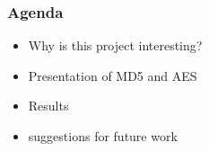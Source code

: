 \begin{frame}
  \frametitle{Agenda}
  \begin{itemize}
    \item Why is this project interesting?
    \item Presentation of MD5 and AES
    \item Results
    \item suggestions for future work
  \end{itemize}
\end{frame}

